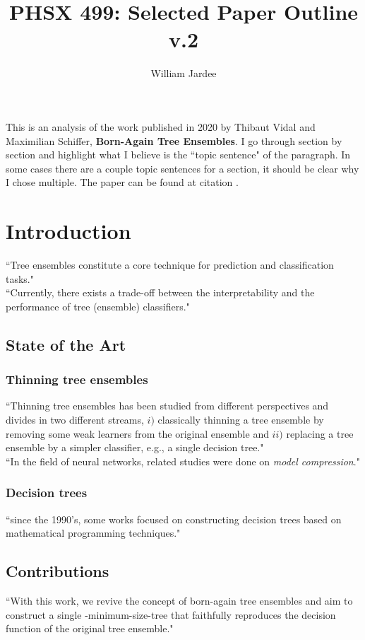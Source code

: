 \documentclass[11pt]{article}
\begin{document}
\title{PHSX 499: Selected Paper Outline v.2}
\author{William Jardee}
\maketitle

This is an analysis of the work published in 2020 by Thibaut Vidal and Maximilian Schiffer, \textbf{Born-Again Tree Ensembles}. I go through section by section and highlight what I believe is the ``topic sentence" of the paragraph. In some cases there are a couple topic sentences for a section, it should be clear why I chose multiple. The paper can be found at citation \cite{pmlr-v119-vidal20a}.


\section{Introduction}	
``Tree ensembles constitute a core technique for prediction and classification tasks."\\
``Currently, there exists a trade-off between the interpretability and the performance of tree (ensemble) classifiers." 

\subsection{State of the Art}
\subsubsection*{Thinning tree ensembles}
``Thinning tree ensembles has been studied from different perspectives and divides in two different streams, $i)$ classically thinning a tree ensemble by removing some weak learners from the original ensemble and $ii)$ replacing a tree ensemble by a simpler classifier, e.g., a single decision tree."\\
``In the field of neural networks, related studies were done on \textit{model compression}."
\subsubsection*{Decision trees}
``since the 1990's, some works focused on constructing decision trees based on mathematical programming techniques."
\subsection{Contributions}
``With this work, we revive the concept of born-again tree ensembles and aim to construct a single -minimum-size-tree that faithfully reproduces the decision function of the original tree ensemble."
\end{document}
